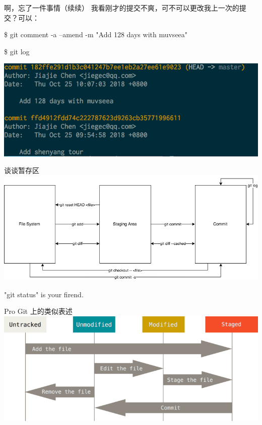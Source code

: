\documentclass{beamer}
\begin{document}
\begin{frame}{啊，忘了一件事情（续续）}
    我看刚才的提交不爽，可不可以更改我上一次的提交？可以：

    \$ git comment -a --amend -m "Add 128 days with muvseea"

    \$ git log

    \includegraphics[width=\linewidth]{2018-10-25-10-52-16.png}
\end{frame}

\begin{frame}{谈谈暂存区}
    \includegraphics[width=\linewidth]{2018-10-25-11-01-32.png}

    "git status" is your firend.
\end{frame}

\begin{frame}{Pro Git 上的类似表述}
    \includegraphics[width=\linewidth]{lifecycle.png}
\end{frame}
\end{document}
